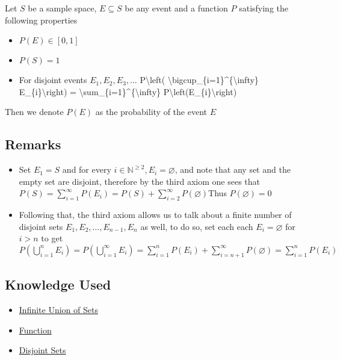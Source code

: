 Let \(S\) be a sample space, \(E \subseteq S\) be any event and a
function \(P\) satisfying the following properties

\begin{itemize}
\tightlist
\item
  \(P(E) \in [0,1]\)
\item
  \(P(S) = 1\)
\item
  For disjoint events \(E_1, E_2, E_3, \dots\) P\textbackslash{}left(
  \textbackslash{}bigcup\_\{i=1\}\^{}\{\textbackslash{}infty\}
  E\_\{i\}\textbackslash{}right) =
  \textbackslash{}sum\_\{i=1\}\^{}\{\textbackslash{}infty\}
  P\textbackslash{}left(E\_\{i\}\textbackslash{}right)
\end{itemize}

Then we denote \(P(E)\) as the probability of the event \(E\)

\hypertarget{remarks}{%
\subsection{Remarks}\label{remarks}}

\begin{itemize}
\tightlist
\item
  Set \(E_{1}= S\) and for every
  \(i \in \mathbb{N} ^{ \ge 2}, E_{i} = \varnothing\), and note that any
  set and the empty set are disjoint, therefore by the third axiom one
  sees that
  \(P\left(S\right)= \sum_{i=1}^{\infty} P\left(E_{i}\right) = P\left(S\right)  +  \sum_{i=2}^{\infty} P\left( \varnothing\right)\)Thus
  \(P\left( \varnothing\right) = 0\)
\item
  Following that, the third axiom allows us to talk about a finite
  number of disjoint sets
  \(E_{1} , E_{2} , \dotsc  , E_{n - 1} , E_{n}\) as well, to do so, set
  each each \(E_{i} = \varnothing\) for \(i > n\) to get
  \(P\left( \bigcup_{i=1}^{n} E_{i}\right) = P\left( \bigcup_{i=1}^{\infty} E_{i}\right)= \sum_{i=1}^{n} P\left(E_{i}\right)  +  \sum_{i=n  +  1}^{\infty} P\left( \varnothing\right) = \sum_{i=1}^{n} P\left(E_{i}\right)\)
\end{itemize}

\hypertarget{knowledge-used}{%
\subsection{Knowledge Used}\label{knowledge-used}}

\begin{itemize}
\tightlist
\item
  \href{Infinite_Union_of_Sets}{Infinite Union of Sets}
\item
  \url{Function}
\item
  \href{Disjoint_Sets}{Disjoint Sets}
\end{itemize}
